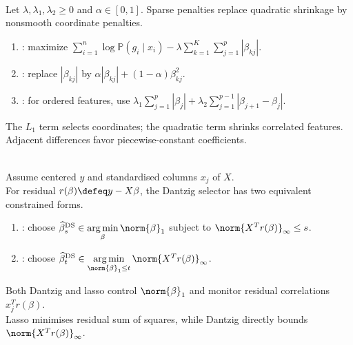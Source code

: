 \begin{method} \label{meth:sl-sparse-and-structured-high-dimensional-penalties} \\
Let $\lambda,\lambda_1,\lambda_2\geq0$ and $\alpha\in[0,1]$. Sparse penalties replace quadratic shrinkage by nonsmooth coordinate penalties.
\begin{enumerate}[label=(\roman*)]
\setlength{\itemsep}{0pt}
\item {}: maximize $\sum\limits_{i=1}^n\log\mathbb{P}(g_i\mid x_i)-\lambda\sum\limits_{k=1}^K\sum\limits_{j=1}^p|\beta_{kj}|$.
\item {}: replace $|\beta_{kj}|$ by $\alpha|\beta_{kj}|+(1-\alpha)\beta_{kj}^2$.
\item {}: for ordered features, use $\lambda_1\sum\limits_{j=1}^p|\beta_j|+\lambda_2\sum\limits_{j=1}^{p-1}|\beta_{j+1}-\beta_j|$.
\end{enumerate}
The $L_1$ term selects coordinates; the quadratic term shrinks correlated features.\\
Adjacent differences favor piecewise-constant coefficients.
\end{method}

\begin{method} \label{meth:sl-dantzig-selector} \\
Assume centered $y$ and standardised columns $x_j$ of $X$.\\
For residual $r(\beta)\defeq y-X\beta$, the Dantzig selector has two equivalent constrained forms.
\begin{enumerate}[label=(\roman*)]
\setlength{\itemsep}{0pt}
\item {}: choose $\widehat{\beta}^{\mathrm{DS}}_s\in\operatorname*{arg\,min}\limits_{\beta}\norm{\beta}_1$ subject to $\norm{X^Tr(\beta)}_\infty\leq s$.
\item {}: choose $\widehat{\beta}^{\mathrm{DS}}_t\in\operatorname*{arg\,min}\limits_{\norm{\beta}_1\leq t}\norm{X^Tr(\beta)}_\infty$.
\end{enumerate}
Both Dantzig and lasso control $\norm{\beta}_1$ and monitor residual correlations $x_j^Tr(\beta)$.\\
Lasso minimises residual sum of squares, while Dantzig directly bounds $\norm{X^Tr(\beta)}_\infty$.
\end{method}

